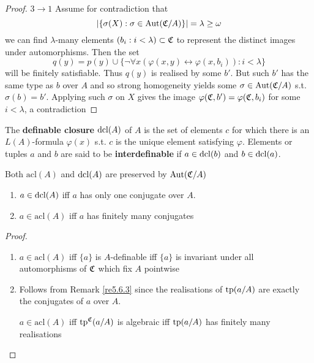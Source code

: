 \documentclass[11pt]{article}
\def \acl {\text{acl}}
\begin{document}
\begin{proof}
\(3\to 1\) Assume for contradiction that
\begin{equation*}
\abs{\{\sigma(X):\sigma\in\Aut(\fC/A)\}}=\lambda\ge\omega
\end{equation*}
we can find \(\lambda\)-many elements \((b_i:i<\lambda)\subset\mathfrak{C}\) to represent the distinct images under automorphisms.
Then the set
\begin{equation*}
q(y)=p(y)\cup\{\neg\forall x(\varphi(x,y)\leftrightarrow\varphi(x,b_i)):i<\lambda\}
\end{equation*}
will be finitely satisfiable. Thus \(q(y)\) is realised by some \(b'\). But such \(b'\) has the
same type as \(b\) over \(A\) and so strong homogeneity yields some \(\sigma\in\operatorname{\text{Aut}}(\mathfrak{C}/A)\)
s.t. \(\sigma(b)=b'\). Applying such \(\sigma\) on \(X\) gives the image \(\varphi(\mathfrak{C},b')=\varphi(\mathfrak{C},b_i)\) for some \(i<\lambda\),
a contradiction
\end{proof}





\begin{definition}[]
The \textbf{definable closure} \(\operatorname{dcl}(A)\) of \(A\) is the set of elements \(c\) for which there is
an \(L(A)\)-formula \(\varphi(x)\) s.t. \(c\) is the unique element satisfying \(\varphi\). Elements or
tuples \(a\) and \(b\) are said to be \textbf{interdefinable} if \(a\in\operatorname{dcl}(b)\) and \(b\in\operatorname{dcl}(a)\).
\end{definition}

Both \(\acl(A)\) and \(\operatorname{dcl}(A)\) are preserved by \(\operatorname{\text{Aut}}(\mathfrak{C}/A)\)

\begin{corollary}[]
\begin{enumerate}
\item \(a\in\operatorname{dcl}(A)\) iff \(a\) has only one conjugate over \(A\).
\item \(a\in\acl(A)\)  iff \(a\) has finitely many conjugates
\end{enumerate}
\end{corollary}

\begin{proof}
\begin{enumerate}
\item \(a\in\acl(A)\) iff \(\{a\}\) is \(A\)-definable iff \(\{a\}\) is invariant under all automorphisms
of \(\mathfrak{C}\) which fix \(A\) pointwise
\item Follows from Remark \ref{re5.6.3} since the realisations of \(\operatorname{tp}(a/A)\) are exactly the
conjugates of \(a\) over \(A\).

\(a\in\acl(A)\) iff \(\operatorname{tp}^{\mathfrak{C}}(a/A)\) is algebraic iff \(\operatorname{tp}(a/A)\) has finitely many realisations
\end{enumerate}
\end{proof}
\end{document}
